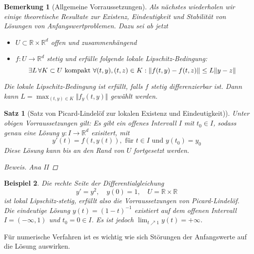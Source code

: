 \documentclass[12pt]{article}
\theoremstyle{break}
\newtheorem{theorem}{Satz}[subsection]
\newtheorem*{comment*}{Bemerkung}
\newtheorem{example}[theorem]{Beispiel}
\begin{document}
\begin{comment*}[Allgemeine Vorraussetzungen]
Als nächstes wiederholen wir einige theoretische Resultate zur Existenz, Eindeutigkeit und Stabilität von Lösungen von Anfangswertproblemen. Dazu sei ab jetzt
\begin{itemize}
  \item $U \subset \mathbb{R} \times \mathbb{R}^d$ offen und zusammenhängend
  \item $f: U \rightarrow \mathbb{R}^d$ stetig und erfülle folgende lokale Lipschitz-Bedingung:
  $$\exists L \thinspace \forall K \subset U \text{ kompakt } \forall (t, y), (t,z) \in K: \Vert f(t, y) - f(t,z) \Vert \leq L \Vert y- z \Vert$$
\end{itemize}
Die lokale Lipschitz-Bedingung ist erfüllt, falls $f$ stetig differenzierbar ist. Dann kann $L = \max_{(t, y) \in K} \Vert f_y(t, y) \Vert$ gewählt werden. 
\end{comment*}

\begin{theorem}[Satz von Picard-Lindelöf zur lokalen Existenz und Eindeutigkeit)]
Unter obigen Vorraussetzungen gilt: Es gibt ein offenes Intervall $I$ mit $t_0 \in I$, sodass genau eine Lösung $y: I \rightarrow \mathbb{R}^d$ exisitert, mit
$$y'(t) = f(t, y(t)), \text{ für $t\in I$ und $y(t_0)=y_0$}$$
Diese Lösung kann bis an den Rand von $U$ fortgesetzt werden.
\begin{proof}[Beweis] Ana II \end{proof}
\end{theorem}

\begin{example}
Die rechte Seite der Differentialgleichung
$$y' = y^2, \quad y(0) = 1, \quad U = \mathbb{R} \times \mathbb{R}$$
ist lokal Lipschitz-stetig, erfüllt also die Vorraussetzungen von Picard-Lindelöf. Die eindeutige Lösung $y(t) = (1-t)^{-1}$ existiert auf dem offenen Intervall $I = (-\infty, 1)$ und $t_0 = 0 \in I$. Es ist jedoch $\lim_{t \nearrow 1} y(t) = + \infty$. 
\end{example}

Für numerische Verfahren ist es wichtig wie sich Störungen der Anfangswerte auf die Lösung auswirken.
\end{document}
